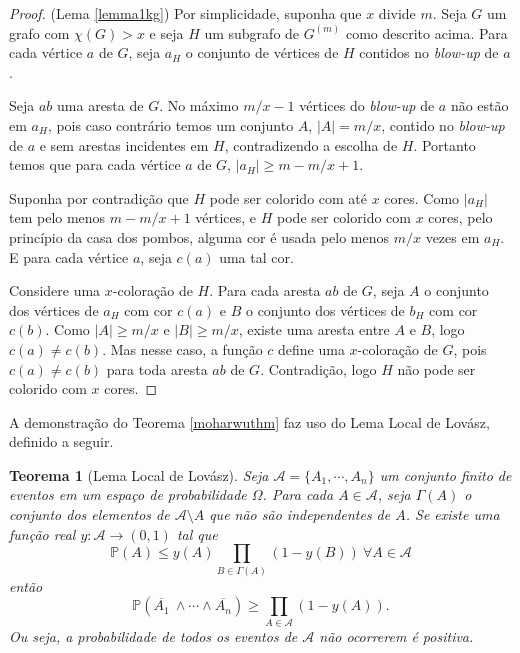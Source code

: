 \documentclass{article}
\newtheorem{teorema}{Teorema}[section]
\newcommand{\bbp}{\mathbb{P}}
\begin{document}
\begin{proof}{(Lema \ref{lemma1kg})}
Por simplicidade, suponha que $x$ divide $m$. Seja $G$ um grafo com $\chi(G) > x$ e seja $H$ um subgrafo de $G^{(m)}$ como descrito acima. Para cada vértice $a$ de $G$, seja $a_H$ o conjunto de vértices de $H$ contidos no \textit{blow-up} de $a$.

Seja $ab$ uma aresta de $G$. No máximo $m/x-1$ vértices do \textit{blow-up} de $a$ não estão em $a_H$, pois caso contrário temos um conjunto $A$, $|A| = m/x$, contido no \textit{blow-up} de $a$ e sem arestas incidentes em $H$, contradizendo a escolha de $H$. Portanto temos que para cada vértice $a$ de $G$, $|a_H| \geq m-m/x+1$.

Suponha por contradição que $H$ pode ser colorido com até $x$ cores. Como $|a_H|$ tem pelo menos $m-m/x+1$ vértices, e $H$ pode ser colorido com $x$ cores, pelo princípio da casa dos pombos, alguma cor é usada pelo menos $m/x$ vezes em $a_H$. E para cada vértice $a$, seja $c(a)$ uma tal cor.

Considere uma $x$-coloração de $H$. Para cada aresta $ab$ de $G$, seja $A$ o conjunto dos vértices de $a_H$ com cor $c(a)$ e $B$ o conjunto dos vértices de $b_H$ com cor $c(b)$. Como $|A|\geq m/x$ e $|B|\geq m/x$, existe uma aresta entre $A$ e $B$, logo $c(a) \neq c(b)$. Mas nesse caso, a função $c$ define uma $x$-coloração de $G$, pois $c(a) \neq c(b)$ para toda aresta $ab$ de $G$. Contradição, logo $H$ não pode ser colorido com $x$ cores.
\end{proof}

A demonstração do Teorema \ref{moharwuthm} faz uso do Lema Local de Lovász, definido a seguir.

\begin{teorema}[Lema Local de Lovász]
Seja $\mathcal{A} = \{A_1, \cdots, A_n\}$ um conjunto finito de eventos em um espaço de probabilidade $\Omega$. Para cada $A\in \mathcal{A}$, seja $\Gamma(A)$ o conjunto dos elementos de $\mathcal{A}\setminus A$ que não são independentes de $A$. Se existe uma função real $y : \mathcal{A} \rightarrow (0,1)$ tal que
\[\bbp(A)\leq y(A) \prod_{B\in \Gamma(A)}(1-y(B))\ \forall A\in \mathcal{A}\]
então 
\[\bbp(\overline{A_1}\ \wedge \cdots \wedge \overline{A_n}) \geq \prod_{A\in\mathcal{A}}(1-y(A)).\]
Ou seja, a probabilidade de todos os eventos de $\mathcal{A}$ não ocorrerem é positiva.
\end{teorema}
\end{document}
